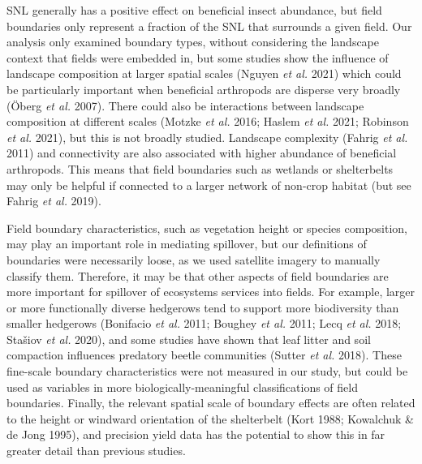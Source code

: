 \documentclass[]{elsarticle} %
\begin{document}
SNL generally has a positive effect on beneficial insect abundance, but field boundaries only represent a fraction of the SNL that surrounds a given field.
Our analysis only examined boundary types, without considering the landscape context that fields were embedded in, but some studies show the influence of landscape composition at larger spatial scales (Nguyen \emph{et al.} 2021) which could be particularly important when beneficial arthropods are disperse very broadly (Öberg \emph{et al.} 2007).
There could also be interactions between landscape composition at different scales (Motzke \emph{et al.} 2016; Haslem \emph{et al.} 2021; Robinson \emph{et al.} 2021), but this is not broadly studied.
Landscape complexity (Fahrig \emph{et al.} 2011) and connectivity are also associated with higher abundance of beneficial arthropods.
This means that field boundaries such as wetlands or shelterbelts may only be helpful if connected to a larger network of non-crop habitat (but see Fahrig \emph{et al.} 2019).

Field boundary characteristics, such as vegetation height or species composition, may play an important role in mediating spillover, but our definitions of boundaries were necessarily loose, as we used satellite imagery to manually classify them.
Therefore, it may be that other aspects of field boundaries are more important for spillover of ecosystems services into fields.
For example, larger or more functionally diverse hedgerows tend to support more biodiversity than smaller hedgerows (Bonifacio \emph{et al.} 2011; Boughey \emph{et al.} 2011; Lecq \emph{et al.} 2018; Stašiov \emph{et al.} 2020), and some studies have shown that leaf litter and soil compaction influences predatory beetle communities (Sutter \emph{et al.} 2018).
These fine-scale boundary characteristics were not measured in our study, but could be used as variables in more biologically-meaningful classifications of field boundaries.
Finally, the relevant spatial scale of boundary effects are often related to the height or windward orientation of the shelterbelt (Kort 1988; Kowalchuk \& de Jong 1995), and precision yield data has the potential to show this in far greater detail than previous studies.
\end{document}
